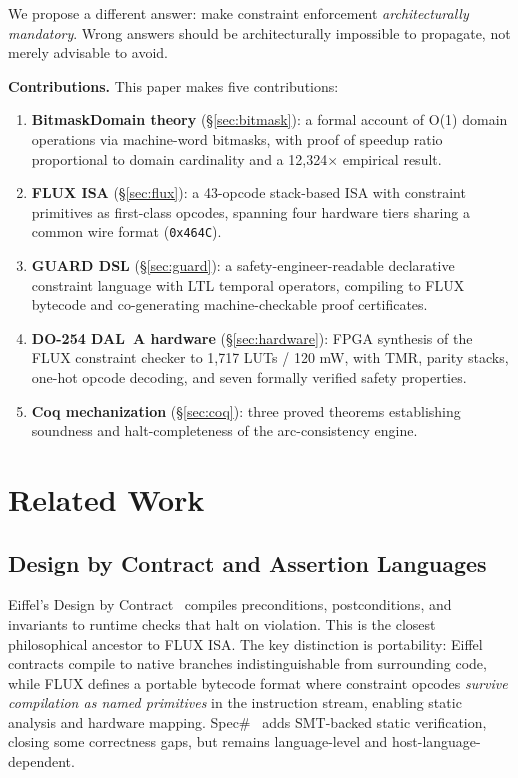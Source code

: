 \documentclass[sigplan,10pt,review]{acmart}
\begin{document}
We propose a different answer: make constraint enforcement \emph{architecturally mandatory}.
Wrong answers should be architecturally impossible to propagate, not merely advisable to avoid.

\smallskip\noindent\textbf{Contributions.} This paper makes five contributions:

\begin{enumerate}
  \item \textbf{BitmaskDomain theory} (\S\ref{sec:bitmask}): a formal account of
    O(1) domain operations via machine-word bitmasks, with proof of speedup ratio
    proportional to domain cardinality and a 12,324$\times$ empirical result.

  \item \textbf{FLUX ISA} (\S\ref{sec:flux}): a 43-opcode stack-based ISA with
    constraint primitives as first-class opcodes, spanning four hardware tiers
    sharing a common wire format (\texttt{0x464C}).

  \item \textbf{GUARD DSL} (\S\ref{sec:guard}): a safety-engineer-readable
    declarative constraint language with LTL temporal operators, compiling to
    FLUX bytecode and co-generating machine-checkable proof certificates.

  \item \textbf{DO-254 DAL~A hardware} (\S\ref{sec:hardware}): FPGA synthesis of
    the FLUX constraint checker to 1,717 LUTs / 120 mW, with TMR, parity stacks,
    one-hot opcode decoding, and seven formally verified safety properties.

  \item \textbf{Coq mechanization} (\S\ref{sec:coq}): three proved theorems
    establishing soundness and halt-completeness of the arc-consistency engine.
\end{enumerate}

\section{Related Work}
\label{sec:related}

\subsection{Design by Contract and Assertion Languages}

Eiffel's Design by Contract~\cite{meyer1992} compiles preconditions, postconditions,
and invariants to runtime checks that halt on violation. This is the closest
philosophical ancestor to FLUX ISA. The key distinction is portability: Eiffel contracts
compile to native branches indistinguishable from surrounding code, while FLUX defines a
portable bytecode format where constraint opcodes \emph{survive compilation as named
primitives} in the instruction stream, enabling static analysis and hardware mapping.
Spec\#~\cite{barnett2011} adds SMT-backed static verification, closing some correctness
gaps, but remains language-level and host-language-dependent.
\end{document}
